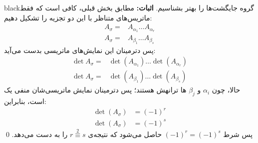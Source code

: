 \documentclass{article}
\begin{document}
\begin{boxes}{black}{گروه جایگشت‌ها را بهتر بشناسیم.}
	\vspace{0.6em}
	\textbf{اثبات:}
	مطابق بخش قبلی، کافی ‌است که فقط ماتریس‌های متناظر با این دو تجزیه را تشکیل دهیم:
	\begin{equation*}
		\begin{aligned}
			A_\sigma =& A_{\alpha_1} \dots A_{\alpha_r} \\
			A_\sigma =& A_{\beta_1} \dots A_{\beta_s} 
		\end{aligned}
	\end{equation*}
	پس دترمینان این نمایش‌های ماتریسی بدست می‌آید:
	\begin{equation*}
		\begin{aligned}
		\det	A_\sigma =& \det(A_{\alpha_1}) \dots \det(A_{\alpha_r}) \\
		\det	A_\sigma =& \det(A_{\beta_1}) \dots \det(A_{\beta_s} )
		\end{aligned}
	\end{equation*}
	حالا، چون $\alpha_i$ و $\beta_j$ ها ترانهش هستند؛ پس دترمینان نمایش ماتریسی‌شان منفی یک است، بنابراین:
	\begin{equation*}
		\begin{aligned}
			\det (A_\sigma) &= (-1)^r \\
			\det (A_\sigma) &= (-1)^s
		\end{aligned}
	\end{equation*}
	پس شرط 
	$(-1)^r = (-1)^s$
	حاصل می‌شود که نتیجه‌ی $r \stackrel{2}{\equiv} s$
	را به دست می‌دهد. 
	\qed
\end{boxes}
\end{document}
